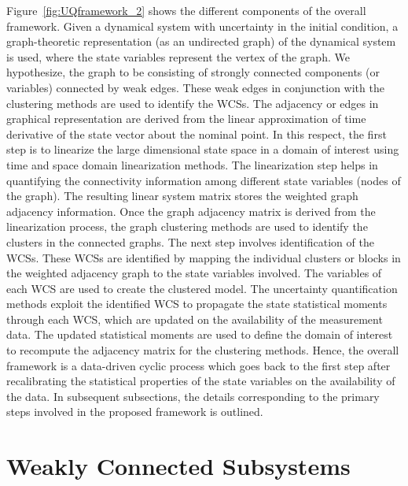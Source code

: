 Figure~\ref{fig:UQframework_2} shows the different components of the overall framework. Given a dynamical system with uncertainty in the initial condition, a graph-theoretic representation (as an undirected graph) of the dynamical system is used, where the state variables represent the vertex of the graph. We hypothesize, the graph to be consisting of strongly connected components (or variables) connected by weak edges. These weak edges in conjunction with the clustering methods are used to identify the WCSs. The adjacency or edges in graphical representation are derived from the linear approximation of time derivative of the state vector about the nominal point. In this respect, the first step is to linearize the large dimensional state space in a domain of interest using time and space domain linearization methods. The linearization step helps in quantifying the connectivity information among different state variables (nodes of the graph). The resulting linear system matrix stores the weighted graph adjacency information. Once the graph adjacency matrix is derived from the linearization process, the graph clustering methods are used to identify the clusters in the connected graphs. The next step involves identification of the WCSs. These WCSs are identified by mapping the individual clusters or blocks in the weighted adjacency graph to the state variables involved. The variables of each WCS are used to create the clustered model. The uncertainty quantification methods exploit the identified WCS to propagate the state statistical moments through each WCS, which are updated on the availability of the measurement data. The updated statistical moments are used to define the domain of interest to recompute the adjacency matrix for the clustering methods. Hence, the overall framework is a data-driven cyclic process which goes back to the first step after recalibrating the statistical properties of the state variables on the availability of the data. In subsequent subsections, the details corresponding to the primary steps involved in the proposed framework is outlined.

\section{Weakly Connected Subsystems}

